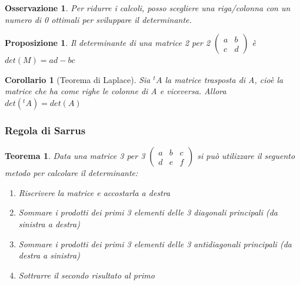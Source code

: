 \documentclass[12pt]{article}
\newenvironment{para}{\begin{adjustwidth}{13mm}{}}{\end{adjustwidth}}
\newtheorem{Corollario}{Corollario}[subsection]
\newtheorem{Teorema}{Teorema}[subsection]
\newtheorem{Proposizione}{Proposizione}[subsection]
\newtheorem{Osservazione}{Osservazione}[subsection]
\begin{document}
\begin{para}
\begin{Osservazione}
    Per ridurre i calcoli, posso scegliere una riga/colonna con un numero di 0 ottimali per sviluppare il determinante.
\end{Osservazione}
\begin{Proposizione}
Il determinante di una matrice 2 per 2 $\begin{pmatrix}
    a & b \\
    c & d
\end{pmatrix}$ è $det(M) = ad - bc$
\end{Proposizione}

\begin{Corollario}[Teorema di Laplace]
    Sia $^tA$ la matrice trasposta di A, cioè la matrice che ha come righe le colonne di A e viceversa. Allora $det(^tA)=det(A)$
\end{Corollario}

\subsubsection{Regola di Sarrus}
\begin{Teorema}
    Data una matrice 3 per 3 $\begin{pmatrix}
    a & b  & c\\
    d & e  & f
\end{pmatrix}$ si può utilizzare il seguento metodo per calcolare il determinante: \begin{enumerate}
    \item Riscrivere la matrice e accostarla a destra
    \item Sommare i prodotti dei primi 3 elementi delle 3 diagonali principali (da sinistra a destra)
    \item Sommare i prodotti dei primi 3 elementi delle 3 antidiagonali principali (da destra a sinistra)
    \item Sottrarre il secondo risultato al primo
\end{enumerate}    
\end{Teorema}


\end{para}
\end{document}
